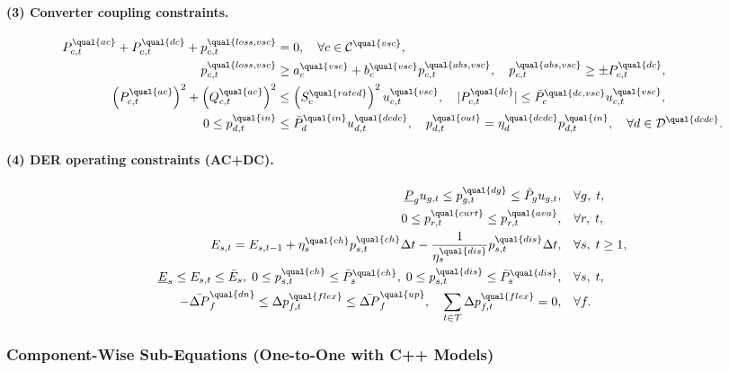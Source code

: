 \paragraph{(3) Converter coupling constraints.}
\begin{align}
P^{\qual{ac}}_{c,t} + P^{\qual{dc}}_{c,t}
+ p^{\qual{loss,vsc}}_{c,t} &= 0,
\quad \forall c\in\mathcal{C}^{\qual{vsc}},
\label{eq:tstr-h-vsc-balance}
\\
p^{\qual{loss,vsc}}_{c,t}
&\ge a^{\qual{vsc}}_c + b^{\qual{vsc}}_c p^{\qual{abs,vsc}}_{c,t},
\quad
p^{\qual{abs,vsc}}_{c,t}\ge \pm P^{\qual{dc}}_{c,t},
\label{eq:tstr-h-vsc-loss}
\\
\left(P^{\qual{ac}}_{c,t}\right)^2+\left(Q^{\qual{ac}}_{c,t}\right)^2
&\le \left(S^{\qual{rated}}_c\right)^2 u^{\qual{vsc}}_{c,t},
\quad
|P^{\qual{dc}}_{c,t}|\le \bar P^{\qual{dc,vsc}}_c u^{\qual{vsc}}_{c,t},
\label{eq:tstr-h-vsc-cap}
\\
0\le p^{\qual{in}}_{d,t}
&\le \bar P^{\qual{in}}_d u^{\qual{dcdc}}_{d,t},
\quad
p^{\qual{out}}_{d,t} = \eta^{\qual{dcdc}}_d p^{\qual{in}}_{d,t},
\quad \forall d\in\mathcal{D}^{\qual{dcdc}}.
\label{eq:tstr-h-dcdc}
\end{align}

\paragraph{(4) DER operating constraints (AC+DC).}
\begin{align}
\underline P_g u_{g,t}\le p^{\qual{dg}}_{g,t}\le \bar P_g u_{g,t},
\quad &\forall g,\; t,
\label{eq:tstr-h-dg}
\\
0\le p^{\qual{curt}}_{r,t}\le p^{\qual{ava}}_{r,t},
\quad &\forall r,\; t,
\label{eq:tstr-h-ren}
\\
E_{s,t}=E_{s,t-1}
+\eta^{\qual{ch}}_s p^{\qual{ch}}_{s,t}\Delta t
-\frac{1}{\eta^{\qual{dis}}_s}p^{\qual{dis}}_{s,t}\Delta t,
\quad &\forall s,\; t\ge 1,
\label{eq:tstr-h-soc}
\\
\underline E_s\le E_{s,t}\le \bar E_s,\;
0\le p^{\qual{ch}}_{s,t}\le \bar P^{\qual{ch}}_s,\;
0\le p^{\qual{dis}}_{s,t}\le \bar P^{\qual{dis}}_s,
\quad &\forall s,\; t,
\label{eq:tstr-h-soc-bound}
\\
-\bar{\Delta P}^{\qual{dn}}_f \le \Delta p^{\qual{flex}}_{f,t}
\le \bar{\Delta P}^{\qual{up}}_f,
\quad
\sum_{t\in\mathcal{T}} \Delta p^{\qual{flex}}_{f,t}=0,
\quad &\forall f.
\label{eq:tstr-h-flex}
\end{align}

\subsubsection{Component-Wise Sub-Equations (One-to-One with C++ Models)}
\label{sec:tstr-component-wise}

